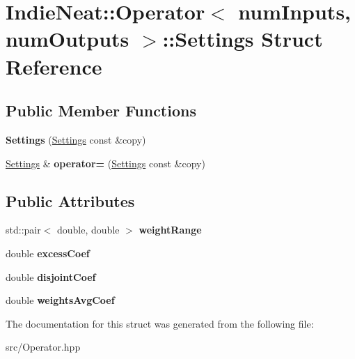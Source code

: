 \hypertarget{struct_indie_neat_1_1_operator_1_1_settings}{}\section{Indie\+Neat\+:\+:Operator$<$ num\+Inputs, num\+Outputs $>$\+:\+:Settings Struct Reference}
\label{struct_indie_neat_1_1_operator_1_1_settings}
\subsection*{Public Member Functions}
\begin{DoxyCompactItemize}
\item 
\mbox{\label{struct_indie_neat_1_1_operator_1_1_settings_abae993de1b2199df3dcaa49788e8b804}} 
{\bfseries Settings} (\hyperlink{struct_indie_neat_1_1_operator_1_1_settings}{Settings} const \&copy)
\item 
\mbox{\label{struct_indie_neat_1_1_operator_1_1_settings_a7e2a44df551648c656a6fdcac83a3d75}} 
\hyperlink{struct_indie_neat_1_1_operator_1_1_settings}{Settings} \& {\bfseries operator=} (\hyperlink{struct_indie_neat_1_1_operator_1_1_settings}{Settings} const \&copy)
\end{DoxyCompactItemize}
\subsection*{Public Attributes}
\begin{DoxyCompactItemize}
\item 
\mbox{\label{struct_indie_neat_1_1_operator_1_1_settings_aeed191109e68d20a2a426de8aaae8549}} 
std\+::pair$<$ double, double $>$ {\bfseries weight\+Range}
\item 
\mbox{\label{struct_indie_neat_1_1_operator_1_1_settings_ade01531239ad56b984fc1ba296965d07}} 
double {\bfseries excess\+Coef}
\item 
\mbox{\label{struct_indie_neat_1_1_operator_1_1_settings_a9bdd3801df3323d02268bffc4fd03b90}} 
double {\bfseries disjoint\+Coef}
\item 
\mbox{\label{struct_indie_neat_1_1_operator_1_1_settings_a7fb0853b84e3c7ff412f28b027918c48}} 
double {\bfseries weights\+Avg\+Coef}
\end{DoxyCompactItemize}


The documentation for this struct was generated from the following file\+:\begin{DoxyCompactItemize}
\item 
src/Operator.\+hpp\end{DoxyCompactItemize}
